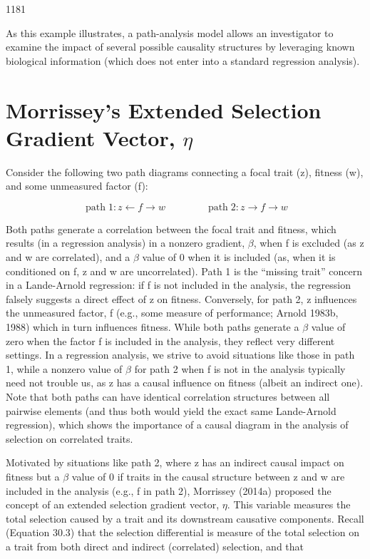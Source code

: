 \documentclass{article}
\begin{document}
1181

As this example illustrates, a path-analysis model allows an investigator to examine the impact of several possible causality structures by leveraging known biological information (which does not enter into a standard regression analysis).

\section{Morrissey's Extended Selection Gradient Vector,  $ \eta $}
Consider the following two path diagrams connecting a focal trait (z), fitness (w), and some unmeasured factor (f):

\begin{equation}
\operatorname{path}1\colon z\leftarrow f\rightarrow w\qquad\qquad\operatorname{path}2\colon z\rightarrow f\rightarrow w
\end{equation}

Both paths generate a correlation between the focal trait and fitness, which results (in a regression analysis) in a nonzero gradient,  $ \beta $, when f is excluded (as z and w are correlated), and a  $ \beta $ value of 0 when it is included (as, when it is conditioned on f, z and w are uncorrelated). Path 1 is the “missing trait” concern in a Lande-Arnold regression: if f is not included in the analysis, the regression falsely suggests a direct effect of z on fitness. Conversely, for path 2, z influences the unmeasured factor, f (e.g., some measure of performance; Arnold 1983b, 1988) which in turn influences fitness. While both paths generate a  $ \beta $ value of zero when the factor f is included in the analysis, they reflect very different settings. In a regression analysis, we strive to avoid situations like those in path 1, while a nonzero value of  $ \beta $ for path 2 when f is not in the analysis typically need not trouble us, as z has a causal influence on fitness (albeit an indirect one). Note that both paths can have identical correlation structures between all pairwise elements (and thus both would yield the exact same Lande-Arnold regression), which shows the importance of a causal diagram in the analysis of selection on correlated traits.

Motivated by situations like path 2, where z has an indirect causal impact on fitness but a  $ \beta $ value of 0 if traits in the causal structure between z and w are included in the analysis (e.g., f in path 2), Morrissey (2014a) proposed the concept of an extended selection gradient vector,  $ \eta $. This variable measures the total selection caused by a trait and its downstream causative components. Recall (Equation 30.3) that the selection differential is measure of the total selection on a trait from both direct and indirect (correlated) selection, and that
\end{document}
